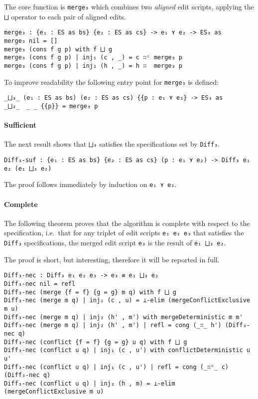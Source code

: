\documentclass[../Thesis.tex]{subfiles}
\begin{document}
	The core function is \texttt{merge₃} which combines two 
	\emph{aligned} edit scripts, applying the \texttt{⨆} operator to
	each pair of aligned edits. 
\begin{verbatim}
merge₃ : {e₁ : ES as bs} {e₂ : ES as cs} -> e₁ ⋎ e₂ -> ES₃ as
merge₃ nil = []
merge₃ (cons f g p) with f ⨆ g
merge₃ (cons f g p) | inj₁ (c , _) = c ∷ᶜ merge₃ p
merge₃ (cons f g p) | inj₂ (h , _) = h ∷  merge₃ p
\end{verbatim}
	
	To improve readability the following entry point for \texttt{merge₃} is
	defined:
\begin{verbatim}
_⨆₃_ (e₁ : ES as bs) (e₂ : ES as cs) {{p : e₁ ⋎ e₂} -> ES₃ as
_⨆₃_  _ _ {{p}} = merge₃ p
\end{verbatim}
	
	\paragraph{Sufficient}
	The next result shows that \texttt{⨆₃} satisfies
	the specifications set by \texttt{Diff₃}.
	
\begin{verbatim}
Diff₃-suf : {e₁ : ES as bs} {e₂ : ES as cs} (p : e₁ ⋎ e₂) -> Diff₃ e₁ e₂ (e₁ ⨆₃ e₂)
\end{verbatim}
	The proof follows immediately by induction 
	on \texttt{e₁ ⋎ e₂}.

	\paragraph{Complete}
	The following theorem proves that the algorithm is
	complete with respect to the specification, i.e.\ that
	for any triplet of edit scripts \texttt{e₁ e₂ e₃} that satisfies 
	the \texttt{Diff₃} specifications, the merged
	edit script \texttt{e₃} is the result of \texttt{e₁ ⨆₃ e₂}.
	
	The proof is short, but interesting, therefore it will
	be reported in full.
	
\begin{verbatim}
Diff₃-nec : Diff₃ e₁ e₂ e₃ -> e₃ ≡ e₁ ⨆₃ e₂
Diff₃-nec nil = refl
Diff₃-nec (merge {f = f} {g = g} m q) with f ⨆ g
Diff₃-nec (merge m q) | inj₁ (c , u) = ⊥-elim (mergeConflictExclusive m u)
Diff₃-nec (merge m q) | inj₂ (h' , m') with mergeDeterministic m m'
Diff₃-nec (merge m q) | inj₂ (h' , m') | refl = cong (_∷_ h') (Diff₃-nec q)
Diff₃-nec (conflict {f = f} {g = g} u q) with f ⨆ g
Diff₃-nec (conflict u q) | inj₁ (c , u') with conflictDeterministic u u'
Diff₃-nec (conflict u q) | inj₁ (c , u') | refl = cong (_∷ᶜ_ c) (Diff₃-nec q)
Diff₃-nec (conflict u q) | inj₂ (h , m) = ⊥-elim (mergeConflictExclusive m u)	
\end{verbatim}
\end{document}
